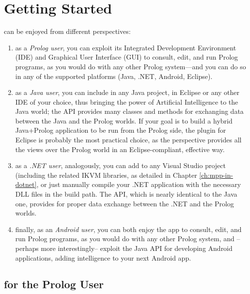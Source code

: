 \chapter{Getting Started}
\label{ch:getting-started}

\tuprolog{} can be enjoyed from different perspectives:
\begin{enumerate}
  \item as a \textit{Prolog user}, you can exploit its Integrated Development
        Environment (IDE) and Graphical User Interface (GUI) to consult, edit, and run Prolog programs, as you would do with any other Prolog system---and you can do so in any of the supported platforms (Java, .NET, Android, Eclipse).
  \item as a \textit{Java user}, you can include \tuprolog{} in any Java project, in Eclipse or any other IDE of your choice,
        thus bringing the power of Artificial Intelligence to the Java world; the \tuprolog{} API provides many classes and methods for exchanging data between the Java and the Prolog worlds.
        If your goal is to build a hybrid Java+Prolog application to be run from the Prolog side, the \tuprolog{} plugin
        for Eclipse is probably the most practical choice, as the \tuprolog{} perspective provides all the views over the Prolog world in an Eclipse-compliant, effective way.
  \item as a \textit{.NET user}, analogously, you can add \tuprolog{} to any
        Visual Studio project (including the related IKVM libraries, as detailed in Chapter \ref{ch:mpp-in-dotnet}, or just manually compile your .NET application with the necessary DLL files in the build path. The \tuprolog{} API, which is nearly identical to the Java one, provides for proper data exchange
        between the .NET and the Prolog worlds.
  \item finally, as an \textit{Android user}, you can both enjoy the \tuprolog{} app
        to consult, edit, and run Prolog programs, as you would do with any other Prolog system, and --perhaps more interestingly-- exploit the \tuprolog{} Java API for developing Android applications, adding intelligence to your next Android app.
\end{enumerate}

\section{\tuprolog{} for the Prolog User}
\label{sec:prolog-user-perspective}

